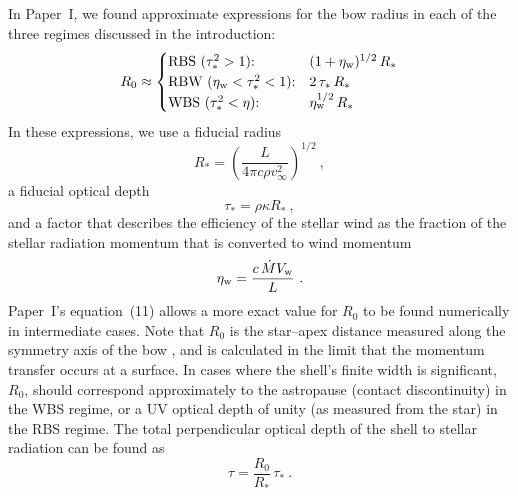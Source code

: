 \documentclass[useAMS, usenatbib, a4paper]{mnras}
\begin{document}
In Paper~I, we found approximate expressions for the bow radius in each of the three regimes discussed in the introduction: 
\begin{equation}
  \label{eq:x-cases}
  R_0 \approx
  \begin{cases}
    \text{RBS (\(\tau_*^2 > 1\)):} & (1 + \eta_{\text{w}})^{1/2} \, R_*  \\
    \text{RBW (\(\eta\ensuremath{_{\text{w}}}< \tau_*^2 < 1\)):} & 2 \, \tau_* \, R_* \\
    \text{WBS (\(\tau_*^2 < \eta\)):} & \eta_{\text{w}}^{1/2} \, R_*  
  \end{cases}
\end{equation}
In these expressions, we use a fiducial radius
\begin{equation}
  \label{eq:Rstar}
  R_* = \left(\frac{L}{4\pi c \rho v_\infty^2}\right)^{1/2} \ ,
\end{equation}
a fiducial optical depth
\begin{equation}
  \label{eq:tau-star}
  \tau_* = \rho \kappa R_* \ ,
\end{equation}
and a factor that describes the efficiency of the stellar wind as the fraction of the stellar radiation momentum that is converted to wind momentum
\begin{equation}
  \label{eq:wind-efficiency}
  \eta_{\text{w}}  = \frac{c\, \dot{M} V_{\text{w}}}{L} \ .
\end{equation}
Paper~I's equation~(11) allows a more exact value for \(R_0\) to be
found numerically in intermediate cases.  Note that \(R_0\) is the
star--apex distance measured along the symmetry axis of the bow
\citetext{see \citealp{Tarango-Yong:2018a} for explanation of
  nomenclature and discussion of bow shapes}, and is calculated in the
limit that the momentum transfer occurs at a surface.  In cases where
the shell's finite width is significant, \(R_0\), should correspond
approximately to the astropause (contact discontinuity) in the WBS
regime, or a UV optical depth of unity (as measured from the star) in
the RBS regime.  The total perpendicular optical depth of the shell to
stellar radiation can be found as
\begin{equation}
  \label{eq:actual-tau}
  \tau = \frac{R_0}{R_*} \, \tau_* \ .
\end{equation}
\end{document}
